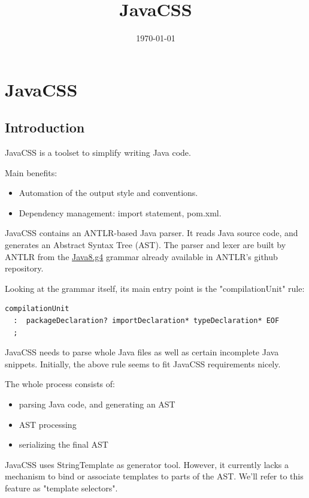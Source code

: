 \documentclass[11pt]{article}
\date{\today}
\title{JavaCSS}
\begin{document}
\maketitle
\tableofcontents

\section{JavaCSS}
\label{sec-1}

\subsection{Introduction}
\label{sec-1-1}
JavaCSS is a toolset to simplify writing Java code.

Main benefits:
\begin{itemize}
\item Automation of the output style and conventions.
\item Dependency management: import statement, pom.xml.
\end{itemize}

JavaCSS contains an ANTLR-based Java parser. It reads Java source code, and generates an Abstract Syntax Tree (AST).
The parser and lexer are built by ANTLR from the \href{https://raw.githubusercontent.com/antlr/grammars-v4/master/java8/Java8.g4}{Java8.g4} grammar already available in ANTLR's github repository.

Looking at the grammar itself, its main entry point is the "compilationUnit" rule:
\begin{verbatim}
compilationUnit
  :  packageDeclaration? importDeclaration* typeDeclaration* EOF
  ;
\end{verbatim}

JavaCSS needs to parse whole Java files as well as certain incomplete Java snippets. Initially, the above rule seems to fit JavaCSS
requirements nicely.

The whole process consists of:
\begin{itemize}
\item parsing Java code, and generating an AST
\item AST processing
\item serializing the final AST
\end{itemize}

JavaCSS uses StringTemplate as generator tool. However, it currently lacks a mechanism to bind or associate templates to parts of the AST.
We'll refer to this feature as "template selectors".
\end{document}
